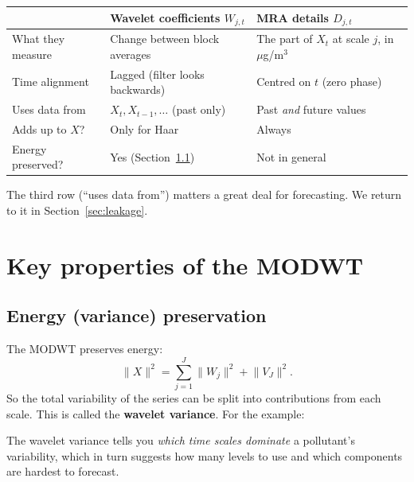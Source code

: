 \documentclass[11pt,a4paper]{article}
\begin{document}
\begin{center}
\begin{tabular}{p{4.2cm}p{5cm}p{5cm}}
\toprule
 & \textbf{Wavelet coefficients} $W_{j,t}$ & \textbf{MRA details} $D_{j,t}$ \\
\midrule
What they measure & Change between block averages & The part of $X_t$ at scale $j$, in $\mu$g/m$^3$ \\
Time alignment & Lagged (filter looks backwards) & Centred on $t$ (zero phase) \\
Uses data from & $X_t, X_{t-1},\dots$ (past only) & Past \emph{and} future values \\
Adds up to $X$? & Only for Haar & Always \\
Energy preserved? & Yes (Section~\ref{sec:energy}) & Not in general \\
\bottomrule
\end{tabular}
\end{center}

The third row (``uses data from'') matters a great deal for forecasting. We return to it in Section~\ref{sec:leakage}.

\section{Key properties of the MODWT}

\subsection{Energy (variance) preservation}
\label{sec:energy}

The MODWT preserves energy:
\[
  \lVert X\rVert^2 = \sum_{j=1}^{J}\lVert W_j\rVert^2 + \lVert V_J\rVert^2 .
\]
So the total variability of the series can be split into contributions from each scale. This is called
the \textbf{wavelet variance}. For the example:

\begin{table}[H]
\centering

\caption{Energy decomposition of the example. Almost all energy is in $V_3$ because the series has a large mean
(25.25). The fluctuating part has energy $20+28+25.5=73.5$, spread fairly evenly over the three scales.}
\end{table}

The wavelet variance tells you \emph{which time scales dominate} a pollutant's variability, which in turn
suggests how many levels to use and which components are hardest to forecast.
\end{document}
